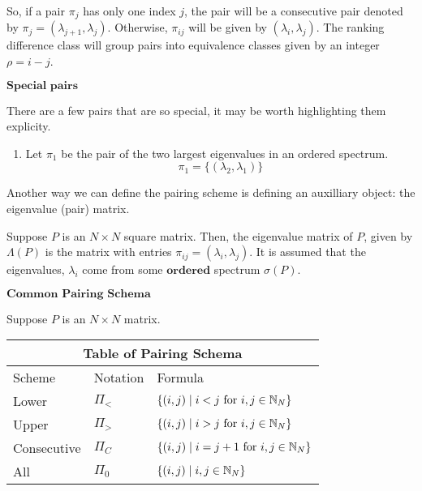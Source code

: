 So, if a pair $\pi_j$ has only one index $j$, the pair will be a consecutive pair denoted by $\pi_j = (\lambda_{j+1}, \lambda_j)$. Otherwise, $\pi_{ij}$ will be given by $(\lambda_{i}, \lambda_j)$. The ranking difference class will group pairs into equivalence classes given by an integer $\rho = i - j$.

\begin{center}
$\textbf{Special pairs}$
\end{center}

There are a few pairs that are so special, it may be worth highlighting them explicity.

\begin{enumerate}
  \item Let $\pi_1$ be the pair of the two largest eigenvalues in an ordered spectrum. 
  $$\pi_1 = \{(\lambda_2,\lambda_1)\}$$
\end{enumerate}

Another way we can define the pairing scheme is defining an auxilliary object: the eigenvalue (pair) matrix.

\begin{definition}
Suppose $P$ is an $N \times N$ square matrix. Then, the eigenvalue matrix of $P$, given by $\Lambda(P)$ is the matrix with entries $\pi_{ij} = (\lambda_i, \lambda_j)$. It is assumed that the eigenvalues, $\lambda_i$ come from some $\textbf{ordered}$ spectrum $\sigma(P)$.
\end{definition}

\begin{center}
$\textbf{Common Pairing Schema}$
\end{center}

Suppose $P$ is an $N \times N$ matrix. \newline

\begin{tabular}{ |p{2.5cm}||p{1.75cm}|p{5.5cm}|  }
 \hline
 \multicolumn{3}{|c|}{Table of Pairing Schema} \\
 \hline
 Scheme & Notation & Formula \\
 \hline
 Lower & $\Pi_<$ & $\{(i,j) \mid i < j \text{ for } i,j \in \mathbb{N}_N \}$ \\
 Upper  & $\Pi_>$ & $\{(i,j) \mid i > j \text{ for } i,j \in \mathbb{N}_N \}$ \\
 Consecutive  & $\Pi_C$ & $\{(i,j) \mid i = j + 1 \text{ for } i,j \in \mathbb{N}_N \}$ \\
 All & $\Pi_0$ & $\{(i,j) \mid i,j \in \mathbb{N}_N \}$ \\
 \hline
\end{tabular}

